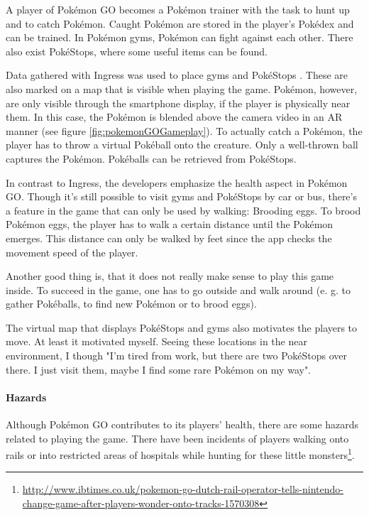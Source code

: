 A player of Pok\'{e}mon GO becomes a Pok\'{e}mon trainer with the task to hunt up and to catch Pok\'{e}mon. Caught Pok\'{e}mon are stored in the player's Pok\'{e}dex and can be trained. In Pok\'{e}mon gyms, Pok\'{e}mon can fight against each other. There also exist Pok\'{e}Stops, where some useful items can be found.

Data gathered with Ingress was used to place gyms and Pok\'{e}Stops \citep{Ingress}. These are also marked on a map that is visible when playing the game. Pok\'{e}mon, however, are only visible through the smartphone display, if the player is physically near them. In this case, the Pok\'{e}mon is blended above the camera video in an AR manner (see figure \ref{fig:pokemonGOGameplay}).
To actually catch a Pok\'{e}mon, the player has to throw a virtual Pok\'{e}ball onto the creature. Only a well-thrown ball captures the Pok\'{e}mon. Pok\'{e}balls can be retrieved from Pok\'{e}Stops.

In contrast to Ingress, the developers emphasize the health aspect in Pok\'{e}mon GO. Though it's still possible to visit gyms and Pok\'{e}Stops by car or bus, there's a feature in the game that can only be used by walking: Brooding eggs. To brood Pok\'{e}mon eggs, the player has to walk a certain distance until the Pok\'{e}mon emerges. This distance can only be walked by feet since the app checks the movement speed of the player.

Another good thing is, that it does not really make sense to play this game inside. To succeed in the game, one has to go outside and walk around (e. g. to gather Pok\'{e}balls, to find new Pok\'{e}mon or to brood eggs).

The virtual map that displays Pok\'{e}Stops and gyms also motivates the players to move. At least it motivated myself. Seeing these locations in the near environment, I though "I'm tired from work, but there are two Pok\'{e}Stops over there. I just visit them, maybe I find some rare Pok\'{e}mon on my way".

\paragraph{Hazards}
Although Pok\'{e}mon GO contributes to its players' health, there are some hazards related to playing the game. There have been incidents of players walking onto rails or into restricted areas of hospitals while hunting for these little monsters\footnote{\url{http://www.ibtimes.co.uk/pokemon-go-dutch-rail-operator-tells-nintendo-change-game-after-players-wonder-onto-tracks-1570308}}.


